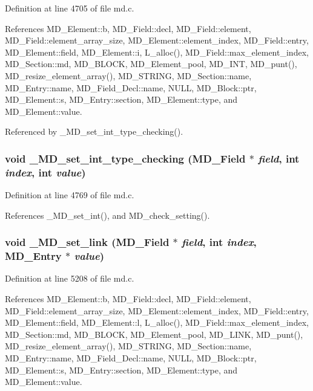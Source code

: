 Definition at line 4705 of file md.c.

References MD\_\-Element::b, MD\_\-Field::decl, MD\_\-Field::element, MD\_\-Field::element\_\-array\_\-size, MD\_\-Element::element\_\-index, MD\_\-Field::entry, MD\_\-Element::field, MD\_\-Element::i, L\_\-alloc(), MD\_\-Field::max\_\-element\_\-index, MD\_\-Section::md, MD\_\-BLOCK, MD\_\-Element\_\-pool, MD\_\-INT, MD\_\-punt(), MD\_\-resize\_\-element\_\-array(), MD\_\-STRING, MD\_\-Section::name, MD\_\-Entry::name, MD\_\-Field\_\-Decl::name, NULL, MD\_\-Block::ptr, MD\_\-Element::s, MD\_\-Entry::section, MD\_\-Element::type, and MD\_\-Element::value.

Referenced by \_\-MD\_\-set\_\-int\_\-type\_\-checking().
\subsubsection{\setlength{\rightskip}{0pt plus 5cm}void \_\-MD\_\-set\_\-int\_\-type\_\-checking (\bf{MD\_\-Field} $\ast$ {\em field}, int {\em index}, int {\em value})}\label{md_8c_0766b9d66dabf361dc6964439f5b47b7}




Definition at line 4769 of file md.c.

References \_\-MD\_\-set\_\-int(), and MD\_\-check\_\-setting().
\subsubsection{\setlength{\rightskip}{0pt plus 5cm}void \_\-MD\_\-set\_\-link (\bf{MD\_\-Field} $\ast$ {\em field}, int {\em index}, \bf{MD\_\-Entry} $\ast$ {\em value})}\label{md_8c_313759f9d424ac4215a0ae45b06a4fa6}




Definition at line 5208 of file md.c.

References MD\_\-Element::b, MD\_\-Field::decl, MD\_\-Field::element, MD\_\-Field::element\_\-array\_\-size, MD\_\-Element::element\_\-index, MD\_\-Field::entry, MD\_\-Element::field, MD\_\-Element::l, L\_\-alloc(), MD\_\-Field::max\_\-element\_\-index, MD\_\-Section::md, MD\_\-BLOCK, MD\_\-Element\_\-pool, MD\_\-LINK, MD\_\-punt(), MD\_\-resize\_\-element\_\-array(), MD\_\-STRING, MD\_\-Section::name, MD\_\-Entry::name, MD\_\-Field\_\-Decl::name, NULL, MD\_\-Block::ptr, MD\_\-Element::s, MD\_\-Entry::section, MD\_\-Element::type, and MD\_\-Element::value.

